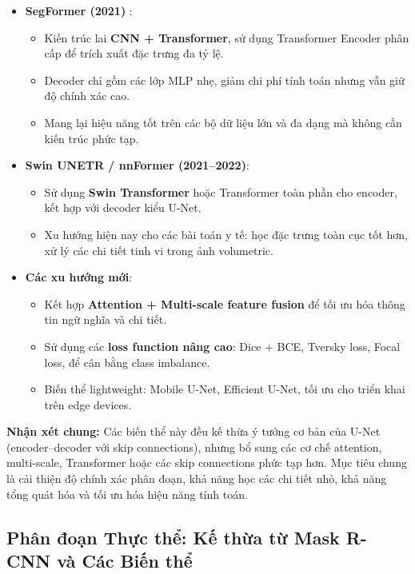 \begin{itemize}
	\item \textbf{SegFormer (2021)} \cite{Xie2021}: 
	\begin{itemize}
		\item Kiến trúc lai \textbf{CNN + Transformer}, sử dụng Transformer Encoder phân cấp để trích xuất đặc trưng đa tỷ lệ.
		\item Decoder chỉ gồm các lớp MLP nhẹ, giảm chi phí tính toán nhưng vẫn giữ độ chính xác cao.
		\item Mang lại hiệu năng tốt trên các bộ dữ liệu lớn và đa dạng mà không cần kiến trúc phức tạp.
	\end{itemize}
	
	\item \textbf{Swin UNETR / nnFormer (2021–2022)}: 
	\begin{itemize}
		\item Sử dụng \textbf{Swin Transformer} hoặc Transformer toàn phần cho encoder, kết hợp với decoder kiểu U-Net.
		\item Xu hướng hiện nay cho các bài toán y tế: học đặc trưng toàn cục tốt hơn, xử lý các chi tiết tinh vi trong ảnh volumetric.
	\end{itemize}
	
	\item \textbf{Các xu hướng mới}: 
	\begin{itemize}
		\item Kết hợp \textbf{Attention + Multi-scale feature fusion} để tối ưu hóa thông tin ngữ nghĩa và chi tiết.
		\item Sử dụng các \textbf{loss function nâng cao}: Dice + BCE, Tversky loss, Focal loss, để cân bằng class imbalance.
		\item Biến thể lightweight: Mobile U-Net, Efficient U-Net, tối ưu cho triển khai trên edge devices.
	\end{itemize}
\end{itemize}

\textbf{Nhận xét chung:} Các biến thể này đều kế thừa ý tưởng cơ bản của U-Net (encoder–decoder với skip connections), nhưng bổ sung các cơ chế attention, multi-scale, Transformer hoặc các skip connections phức tạp hơn. Mục tiêu chung là cải thiện độ chính xác phân đoạn, khả năng học các chi tiết nhỏ, khả năng tổng quát hóa và tối ưu hóa hiệu năng tính toán.

\subsection{Phân đoạn Thực thể: Kế thừa từ Mask R-CNN và Các Biến thể}
\label{subsec:instance_segmentation_mask_rcnn}

